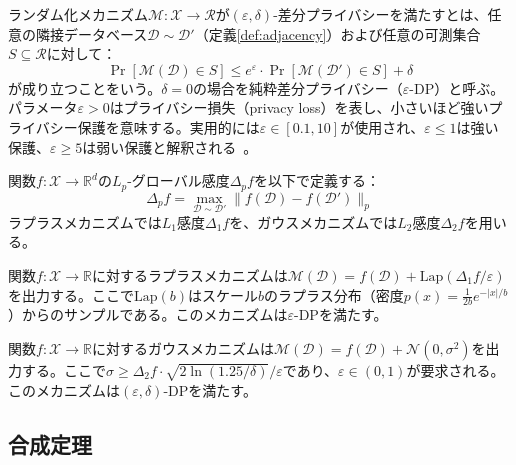 \begin{definition}
ランダム化メカニズム$\mathcal{M}: \mathcal{X} \to \mathcal{R}$が$(\varepsilon, \delta)$-差分プライバシーを満たすとは、任意の隣接データベース$\mathcal{D} \sim \mathcal{D}'$（定義\ref{def:adjacency}）および任意の可測集合$S \subseteq \mathcal{R}$に対して：
\[
\Pr[\mathcal{M}(\mathcal{D}) \in S] \leq e^{\varepsilon} \cdot \Pr[\mathcal{M}(\mathcal{D}') \in S] + \delta
\]
が成り立つことをいう。$\delta = 0$の場合を純粋差分プライバシー（$\varepsilon$-DP）と呼ぶ。パラメータ$\varepsilon > 0$はプライバシー損失（privacy loss）を表し、小さいほど強いプライバシー保護を意味する。実用的には$\varepsilon \in [0.1, 10]$が使用され、$\varepsilon \leq 1$は強い保護、$\varepsilon \geq 5$は弱い保護と解釈される~\cite{dwork2014algorithmic}。
\end{definition}

\begin{definition}
関数$f: \mathcal{X} \to \mathbb{R}^d$の$L_p$-グローバル感度$\Delta_p f$を以下で定義する：
\[
\Delta_p f = \max_{\mathcal{D} \sim \mathcal{D}'} \|f(\mathcal{D}) - f(\mathcal{D}')\|_p
\]
ラプラスメカニズムでは$L_1$感度$\Delta_1 f$を、ガウスメカニズムでは$L_2$感度$\Delta_2 f$を用いる。
\end{definition}

\begin{definition}
関数$f: \mathcal{X} \to \mathbb{R}$に対するラプラスメカニズムは$\mathcal{M}(\mathcal{D}) = f(\mathcal{D}) + \text{Lap}(\Delta_1 f / \varepsilon)$を出力する。ここで$\text{Lap}(b)$はスケール$b$のラプラス分布（密度$p(x) = \frac{1}{2b}e^{-|x|/b}$）からのサンプルである。このメカニズムは$\varepsilon$-DPを満たす。
\end{definition}

\begin{definition}
関数$f: \mathcal{X} \to \mathbb{R}$に対するガウスメカニズムは$\mathcal{M}(\mathcal{D}) = f(\mathcal{D}) + \mathcal{N}(0, \sigma^2)$を出力する。ここで$\sigma \geq \Delta_2 f \cdot \sqrt{2\ln(1.25/\delta)} / \varepsilon$であり、$\varepsilon \in (0, 1)$が要求される。このメカニズムは$(\varepsilon, \delta)$-DPを満たす。
\end{definition}

\subsection{合成定理}

